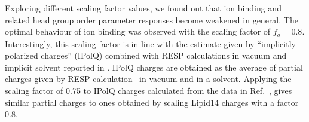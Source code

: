\documentclass[aip,jcp,twocolumn]{revtex4}
\begin{document}
Exploring different scaling factor values, we found out that ion binding and
related head group order parameter responses become weakened in general. 
The optimal behaviour of ion binding was observed with
the scaling factor of $f_q = 0.8$. %
Interestingly, this scaling factor is in line with the estimate
given by ``implicitly polarized charges'' (IPolQ) \cite{ipolq2013}
combined with RESP calculations in vacuum and implicit solvent reported
in \cite{maciejewski14}. IPolQ charges are obtained as the average of
partial charges given by RESP calculation~\cite{RESP_paper}
in vacuum and in a solvent. Applying the scaling factor of 0.75 to
IPolQ charges calculated from the data in Ref.~\cite{maciejewski14},
gives similar partial charges to ones obtained by scaling Lipid14 charges
with a factor 0.8.
\end{document}
